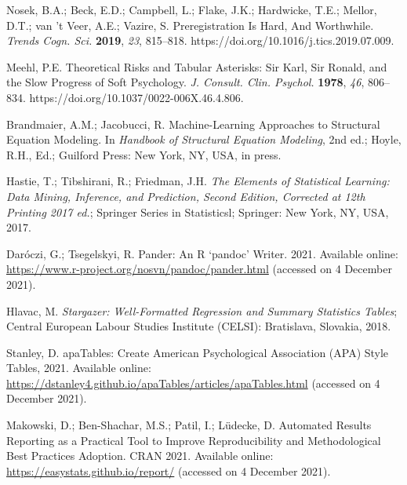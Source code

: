 \documentclass[psych,tutorial,accept,moreauthors,pdftex]{Definitions/mdpi}
\begin{document}
\begin{thebibliography}{999}
Nosek, B.A.; Beck, E.D.; Campbell, L.; Flake, J.K.; Hardwicke, T.E.; Mellor, D.T.; van ’t Veer, A.E.; Vazire, S. Preregistration Is Hard, And Worthwhile. \emph{Trends Cogn. Sci.} \textbf{2019}, \emph{23}, 815--818. https://doi.org/10.1016/j.tics.2019.07.009.


Meehl, P.E. Theoretical Risks and Tabular Asterisks: Sir Karl, Sir Ronald, and the Slow Progress of Soft Psychology. \emph{J. Consult. Clin. Psychol.} \textbf{1978}, \emph{46}, 806--834. https://doi.org/10.1037/0022-006X.46.4.806.


Brandmaier, A.M.; Jacobucci, R. Machine-Learning Approaches to Structural Equation Modeling. In \emph{Handbook of Structural Equation Modeling}, 2nd ed.; Hoyle, R.H., Ed.; {Guilford Press: New York, NY, USA}, in press.


Hastie, T.; Tibshirani, R.; Friedman, J.H. \emph{The Elements of Statistical Learning: Data Mining, Inference, and Prediction, Second Edition, Corrected at 12th Printing 2017 ed.}; Springer Series in Statisticsl;  Springer: New York, NY, USA, 2017.


Daróczi, G.; Tsegelskyi, R. Pander: An R ‘pandoc’ Writer. {2021.} Available online: \url{https://www.r-project.org/nosvn/pandoc/pander.html} (accessed on 4 December 2021).%


Hlavac, M. \emph{Stargazer: Well-Formatted Regression and Summary Statistics Tables}; Central European Labour Studies Institute (CELSI): Bratislava, Slovakia, 2018.


Stanley, D. apaTables: Create American Psychological Association (APA) Style Tables, {2021.} Available online: \url{https://dstanley4.github.io/apaTables/articles/apaTables.html} (accessed on 4 December 2021). %

Makowski, D.; Ben-Shachar, M.S.; Patil, I.; Lüdecke, D. Automated Results Reporting as a Practical Tool to Improve Reproducibility and Methodological Best Practices Adoption. {CRAN 2021.} Available online: \url{https://easystats.github.io/report/} (accessed on 4 December 2021). %


\end{thebibliography}
\end{document}
